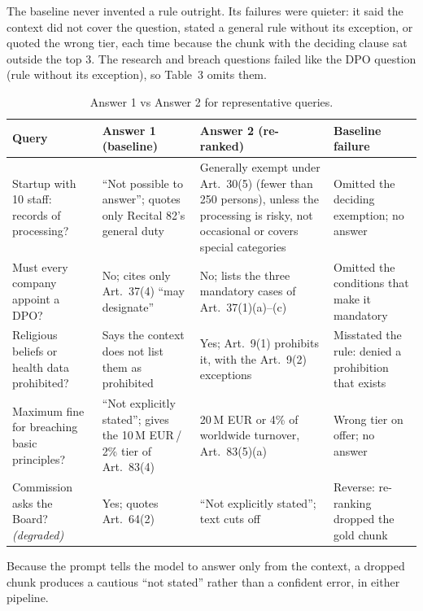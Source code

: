 \documentclass[10pt,a4paper]{article}
\begin{document}
The baseline never invented a rule outright. Its failures were quieter: it said the context did not cover the
question, stated a general rule without its exception, or quoted the wrong tier, each time because the chunk with
the deciding clause sat outside the top 3. The research and breach questions failed like the DPO question (rule
without its exception), so Table~3 omits them.

\begin{table}[!htbp]
\centering\scriptsize
\begin{tabularx}{\textwidth}{@{}>{\raggedright\arraybackslash}p{3.0cm}LL>{\raggedright\arraybackslash}p{2.7cm}@{}}
\toprule
\textbf{Query} & \textbf{Answer 1 (baseline)} & \textbf{Answer 2 (re-ranked)} & \textbf{Baseline failure} \\
\midrule
Startup with 10 staff: records of processing? & ``Not possible to answer''; quotes only Recital 82's general duty & Generally exempt under Art.~30(5) (fewer than 250 persons), unless the processing is risky, not occasional or covers special categories & Omitted the deciding exemption; no answer \\
Must every company appoint a DPO? & No; cites only Art.~37(4) ``may designate'' & No; lists the three mandatory cases of Art.~37(1)(a)--(c) & Omitted the conditions that make it mandatory \\
Religious beliefs or health data prohibited? & Says the context does not list them as prohibited & Yes; Art.~9(1) prohibits it, with the Art.~9(2) exceptions & Misstated the rule: denied a prohibition that exists \\
Maximum fine for breaching basic principles? & ``Not explicitly stated''; gives the 10\,M EUR\,/\,2\% tier of Art.~83(4) & 20\,M EUR or 4\% of worldwide turnover, Art.~83(5)(a) & Wrong tier on offer; no answer \\
Commission asks the Board? \emph{(degraded)} & Yes; quotes Art.~64(2) & ``Not explicitly stated''; text cuts off & Reverse: re-ranking dropped the gold chunk \\
\bottomrule
\end{tabularx}
\caption{Answer 1 vs Answer 2 for representative queries.}
\end{table}

Because the prompt tells the model to answer only from the context, a dropped chunk produces a cautious ``not
stated'' rather than a confident error, in either pipeline.

\end{document}
